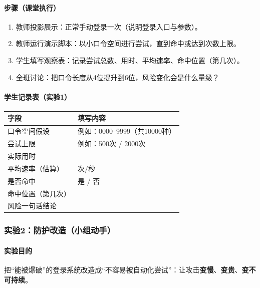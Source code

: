 \documentclass[UTF8,a4paper,12pt]{ctexart}
\begin{document}
\paragraph{步骤（课堂执行）}
\begin{enumerate}
  \item 教师投影展示：正常手动登录一次（说明登录入口与参数）。
  \item 教师运行演示脚本：以小口令空间进行尝试，直到命中或达到次数上限。
  \item 学生填写观察表：记录尝试总数、用时、平均速率、命中位置（第几次）。
  \item 全班讨论：把口令长度从4位提升到6位，风险变化会是什么量级？
\end{enumerate}

\paragraph{学生记录表（实验1）}
\begin{longtable}{@{}p{}p{}@{}}
\toprule
\textbf{字段} & \textbf{填写内容} \\
\midrule
\endhead
口令空间假设 & 例如：0000--9999（共10000种） \\
尝试上限 & 例如：500次 / 2000次 \\
实际用时 & \underline{\hspace{12em}} \\
平均速率（估算） & \underline{\hspace{12em}} 次/秒 \\
是否命中 & 是 / 否 \\
命中位置（第几次） & \underline{\hspace{12em}} \\
风险一句话结论 & \underline{\hspace{20em}} \\
\bottomrule
\end{longtable}

\subsubsection{实验2：防护改造（小组动手）}
\paragraph{实验目的}
把``能被爆破''的登录系统改造成``不容易被自动化尝试''：让攻击\textbf{变慢}、\textbf{变贵}、\textbf{变不可持续}。
\end{document}
